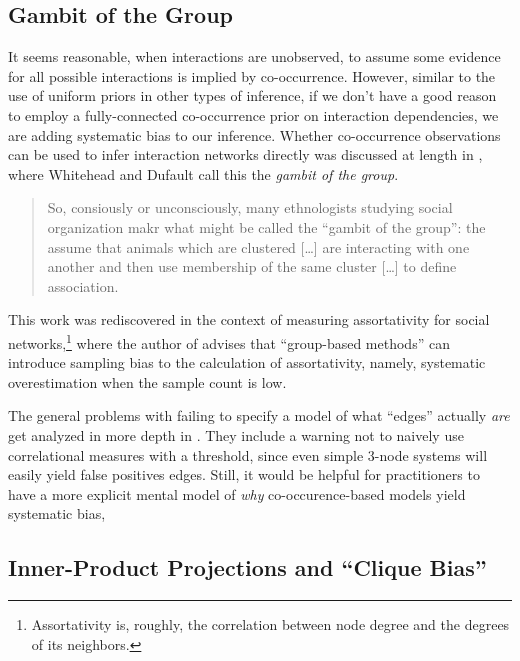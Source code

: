 \documentclass[%
	12pt,
		oneside,
		letterpaper
]{book}
\begin{document}
\subsection{Gambit of the Group}\label{gambit-of-the-group}

It seems reasonable, when interactions are unobserved, to assume some
evidence for all possible interactions is implied by co-occurrence.
However, similar to the use of uniform priors in other types of
inference, if we don't have a good reason to employ a fully-connected
co-occurrence prior on interaction dependencies, we are adding
systematic bias to our inference. Whether co-occurrence observations can
be used to infer interaction networks directly was discussed at length
in \textcite{Techniquesanalyzingvertebrate_Whitehead1999}, where
Whitehead and Dufault call this the \emph{gambit of the group}.

\begin{quote}
So, consiously or unconsciously, many ethnologists studying social
organization makr what might be called the ``gambit of the group'': the
assume that animals which are clustered {[}\ldots{]} are interacting
with one another and then use membership of the same cluster
{[}\ldots{]} to define association.
\end{quote}

This work was rediscovered in the context of measuring assortativity for
social networks,\footnote{Assortativity is, roughly, the correlation
  between node degree and the degrees of its neighbors.} where the
author of \textcite{PerceivedAssortativitySocial_Fisher2017} advises
that ``group-based methods'' can introduce sampling bias to the
calculation of assortativity, namely, systematic overestimation when the
sample count is low.

The general problems with failing to specify a model of what ``edges''
actually \emph{are} get analyzed in more depth in
\textcite{Statisticalinferencelinks_Peel2022}. They include a warning
not to naively use correlational measures with a threshold, since even
simple 3-node systems will easily yield false positives edges. Still, it
would be helpful for practitioners to have a more explicit mental model
of \emph{why} co-occurence-based models yield systematic bias,

\subsection{Inner-Product Projections and ``Clique
Bias''}\label{inner-product-projections-and-clique-bias}
\end{document}
